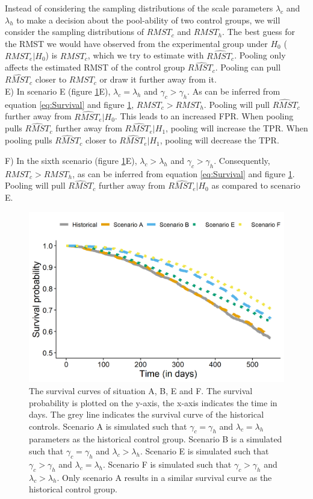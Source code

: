 \documentclass[Royal,sagev,times]{sagej}
\begin{document}
Instead of considering the sampling distributions of the scale parameters $\lambda_c$ and $\lambda_{h}$ to make a decision about the pool-ability of two control groups, we will consider the sampling distributions of $RMST_{c}$ and $RMST_{h}$. The best guess for the RMST we would have observed from the experimental group under $H_0$ ($RMST_e|H_0$) is $RMST_c$, which we try to estimate with $\hat{RMST_c}$. Pooling only affects the estimated RMST of the control group $\hat{RMST_c}$. Pooling can pull $\hat{RMST_c}$ closer to $RMST_c$ or draw it further away from it.\\

E) In scenario E (figure \ref{fig:ScenarioA-F}E), $\lambda_{c} = \lambda_{h}$ and $\gamma_{c} > \gamma_{h}$. As can be inferred from equation \ref{eq:Survival} and figure \ref{fig:ScenarioA-F}, $RMST_{c} > RMST_{h}$. Pooling will pull $\hat{RMST}_{c}$ further away from $\hat{RMST_e}|H_0$. This leads to an increased FPR. When pooling pulls $\hat{RMST}_{c}$ further away from $\hat{RMST_e}|H_1$, pooling will increase the TPR. When pooling pulls $\hat{RMST}_{c}$ closer to $\hat{RMST_e}|H_1$, pooling will decrease the TPR. 

F) In the sixth scenario (figure \ref{fig:ScenarioA-F}E), $\lambda_{c} > \lambda_{h}$ and $\gamma_{c} > \gamma_{h}$. Consequently, $RMST_{c} > RMST_{h}$, as can be inferred from equation \ref{eq:Survival} and figure \ref{fig:ScenarioA-F}. Pooling will pull $\hat{RMST}_{c}$ further away from $\hat{RMST_e}|H_0$ as compared to scenario E.

\begin{figure}[h!] 
\includegraphics[width=12cm]{situaties.png}
  \caption{The survival curves of situation A, B, E and F. The survival probability is plotted on the y-axis, the x-axis indicates the time in days. The grey line indicates the survival curve of the historical controls. Scenario A is simulated such that $\gamma_c = \gamma_{h}$ and $\lambda_c = \lambda_{h}$ parameters as the historical control group. Scenario B is a simulated such that $\gamma_{c} = \gamma_{h}$ and $\lambda_{c} > \lambda_{h}$. Scenario E is simulated such that $\gamma_{c} > \gamma_{h}$ and $\lambda_{c} = \lambda_{h}$. Scenario F is simulated such that $\gamma_{c} > \gamma_{h}$ and $\lambda_{c} > \lambda_{h}$. Only scenario A results in a similar survival curve as the historical control group.}
  \label{fig:ScenarioA-F}
\end{figure}
\end{document}
